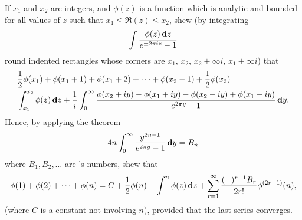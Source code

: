 \begin{wandwmiscexamples}
  \begin{wandwmiscexample}
    If $x_{1}$ and $x_{2}$ are integers, and $\phi(z)$ is a function
    which is analytic and bounded for all values of $z$ such that
    $x_{1} \leq \Re(z) \leq x_{2}$, shew (by integrating
    $$
    \int \frac{\phi(z) \, \mathbf{d} z}{ e^{\pm 2 \pi i z} - 1 }
    $$
    round indented rectangles whose corners are
    $x_{1}$, $x_{2}$, $x_{2} \pm \infty i$, $x_{1} \pm \infty i$)
    that
    \begin{align*}
      &
      \half \phi(x_{1})
      + \phi(x_{1} + 1)
      + \phi(x_{1} + 2)
      + \cdots
      + \phi(x_{2} - 1)
      + \half \phi(x_{2})
      \hfill
      \\
      &
      \hfill
      \int_{x_{1}}^{x_{2}} \phi(z) \dmeasure z
      +
      \frac{1}{i}
      \int_{0}^{\infty}
      \frac{ \phi(x_{2}+iy) - \phi(x_{1}+iy)
        - \phi(x_{2}-iy) + \phi(x_{1}-iy)}{ e^{2 \pi y} - 1 }
      \dmeasure y.
    \end{align*}
    Hence, by applying the theorem
    $$
    4n
    \int_{0}^{\infty}
    \frac{y^{2n-1}}{e^{2 \pi y} - 1}
    \, \mathbf{d} y
    =
    B_{n}
    $$
    where $B_{1}, B_{2}, \ldots$ are \Bernoulli's numbers, shew that
    $$
    \phi(1) + \phi(2) + \cdots + \phi(n)
    =
    C
    + \frac{1}{2} \phi(n)
    + \int^{n} \phi(z) \, \mathbf{d} z
    +
    \sum_{r=1}^{\infty}
    \frac{(-)^{r-1} B_{r}}{2r!} \phi^{(2r-1)}(n),
    $$
    (where $C$ is a constant not involving $n$), provided that the
    last series converges.


\end{wandwmiscexample}
\end{wandwmiscexamples}
